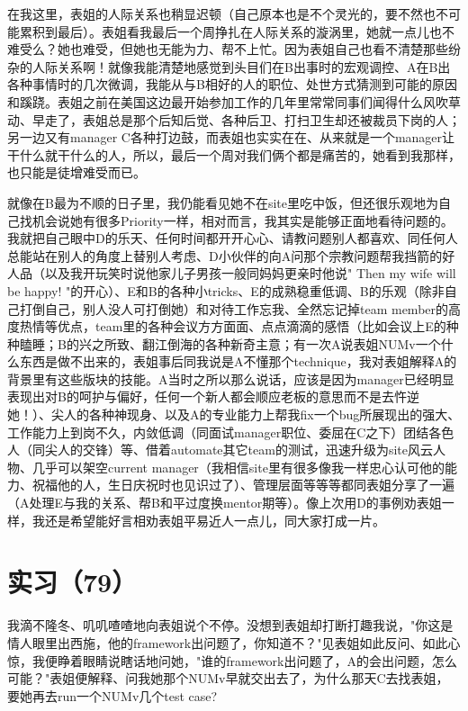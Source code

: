 \documentclass[12pt]{book}
\begin{document}
在我这里，表姐的人际关系也稍显迟顿（自己原本也是不个灵光的，要不然也不可能累积到最后）。表姐看我最后一个周挣扎在人际关系的漩涡里，她就一点儿也不难受么？她也难受，但她也无能为力、帮不上忙。因为表姐自己也看不清楚那些纷杂的人际关系啊！就像我能清楚地感觉到头目们在B出事时的宏观调控、A在B出各种事情时的几次微调，我能从与B相好的人的职位、处世方式猜测到可能的原因和蹊跷。表姐之前在美国这边最开始参加工作的几年里常常同事们闻得什么风吹草动、早走了，表姐总是那个后知后觉、各种后卫、打扫卫生却还被裁员下岗的人；另一边又有manager C各种打边鼓，而表姐也实实在在、从来就是一个manager让干什么就干什么的人，所以，最后一个周对我们俩个都是痛苦的，她看到我那样，也只能是徒增难受而已。

就像在B最为不顺的日子里，我仍能看见她不在site里吃中饭，但还很乐观地为自己找机会说她有很多Priority一样，相对而言，我其实是能够正面地看待问题的。我就把自己眼中D的乐天、任何时间都开开心心、请教问题别人都喜欢、同任何人总能站在别人的角度上替别人考虑、D小伙伴的向A问那个宗教问题帮我挡箭的好人品（以及我开玩笑时说他家儿子男孩一般同妈妈更亲时他说" Then my wife will be happy! "的开心）、E和B的各种小tricks、E的成熟稳重低调、B的乐观（除非自己打倒自己，别人没人可打倒她）和对待工作忘我、全然忘记掉team member的高度热情等优点，team里的各种会议方方面面、点点滴滴的感悟（比如会议上E的种种瞌睡；B的兴之所致、翻江倒海的各种新奇主意；有一次A说表姐NUMv一个什么东西是做不出来的，表姐事后同我说是A不懂那个technique，我对表姐解释A的背景里有这些版块的技能。A当时之所以那么说话，应该是因为manager已经明显表现出对B的呵护与偏好，任何一个新人都会顺应老板的意思而不是去忤逆她！）、尖人的各种神现身、以及A的专业能力上帮我fix一个bug所展现出的强大、工作能力上到岗不久，内敛低调（同面试manager职位、委屈在C之下）团结各色人（同尖人的交锋）等、借着automate其它team的测试，迅速升级为site风云人物、几乎可以架空current manager（我相信site里有很多像我一样忠心认可他的能力、祝福他的人，生日庆祝时也见识过了）、管理层面等等等都同表姐分享了一遍（A处理E与我的关系、帮B和平过度换mentor期等）。像上次用D的事例劝表姐一样，我还是希望能好言相劝表姐平易近人一点儿，同大家打成一片。

\section{实习（79）　}
\label{sec-5-82}

我滴不隆冬、叽叽喳喳地向表姐说个不停。没想到表姐却打断打趣我说，"你这是情人眼里出西施，他的framework出问题了，你知道不？"见表姐如此反问、如此心惊，我便睁着眼睛说瞎话地问她，"谁的framework出问题了，A的会出问题，怎么可能？"表姐便解释、问我她那个NUMv早就交出去了，为什么那天C去找表姐，要她再去run一个NUMv几个test case? 
\end{document}
